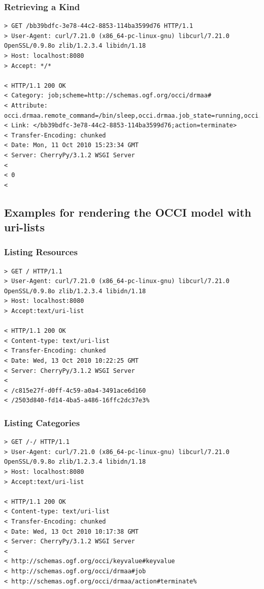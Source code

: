 \documentclass[10pt,a4paper]{article}
\begin{document}
\subsubsection{Retrieving a Kind}

\begin{verbatim}
> GET /bb39bdfc-3e78-44c2-8853-114ba3599d76 HTTP/1.1
> User-Agent: curl/7.21.0 (x86_64-pc-linux-gnu) libcurl/7.21.0 OpenSSL/0.9.8o zlib/1.2.3.4 libidn/1.18
> Host: localhost:8080
> Accept: */*

< HTTP/1.1 200 OK
< Category: job;scheme=http://schemas.ogf.org/occi/drmaa#
< Attribute: occi.drmaa.remote_command=/bin/sleep,occi.drmaa.job_state=running,occi.drmaa.args=100,occi.drmaa.job_id=4657
< Link: </bb39bdfc-3e78-44c2-8853-114ba3599d76;action=terminate>
< Transfer-Encoding: chunked
< Date: Mon, 11 Oct 2010 15:23:34 GMT
< Server: CherryPy/3.1.2 WSGI Server
< 
< 0
<
\end{verbatim}

\subsection{Examples for rendering the OCCI model with uri-lists}

\subsubsection{Listing Resources}

\begin{verbatim}
> GET / HTTP/1.1
> User-Agent: curl/7.21.0 (x86_64-pc-linux-gnu) libcurl/7.21.0 OpenSSL/0.9.8o zlib/1.2.3.4 libidn/1.18
> Host: localhost:8080
> Accept:text/uri-list

< HTTP/1.1 200 OK
< Content-type: text/uri-list
< Transfer-Encoding: chunked
< Date: Wed, 13 Oct 2010 10:22:25 GMT
< Server: CherryPy/3.1.2 WSGI Server
< 
< /c815e27f-d0ff-4c59-a0a4-3491ace6d160
< /2503d840-fd14-4ba5-a486-16ffc2dc37e3%  
\end{verbatim}

\subsubsection{Listing Categories}

\begin{verbatim}
> GET /-/ HTTP/1.1
> User-Agent: curl/7.21.0 (x86_64-pc-linux-gnu) libcurl/7.21.0 OpenSSL/0.9.8o zlib/1.2.3.4 libidn/1.18
> Host: localhost:8080
> Accept:text/uri-list

< HTTP/1.1 200 OK
< Content-type: text/uri-list
< Transfer-Encoding: chunked
< Date: Wed, 13 Oct 2010 10:17:38 GMT
< Server: CherryPy/3.1.2 WSGI Server
< 
< http://schemas.ogf.org/occi/keyvalue#keyvalue
< http://schemas.ogf.org/occi/drmaa#job
< http://schemas.ogf.org/occi/drmaa/action#terminate%    
\end{verbatim}
\end{document}

